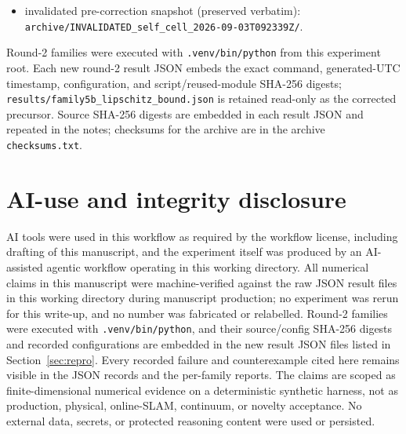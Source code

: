 \documentclass[12pt]{article}
\begin{document}
\begin{itemize}
\texttt{figures/family5\_robust\_surrogate.png}, \texttt{figures/family5\_rank\_events.png},
\texttt{figures/family4c\_trajectory\_control.png},
\texttt{figures/family6\_snr\_sweep.png}, \texttt{figures/family6\_correlation\_effect.png},
\texttt{figures/family6\_noise\_whitening\_sanity.png},
\texttt{figures/family6\_retention\_spectra\_colored.png},
\texttt{figures/family7\_resolution\_convergence.png},
\texttt{figures/family7\_frequency\_rank\_sweep.png}, \texttt{figures/family7\_contrast\_sweep.png},
\texttt{figures/family8\_composition\_identity.png}, \texttt{figures/family8\_mode\_distinction.png},
\texttt{figures/family9\_seed\_replications.png}, \texttt{figures/family9\_pose\_dof\_ablation.png},
\texttt{figures/family9\_rx\_T\_basis\_ablation.png},
\texttt{figures/family5b\_lipschitz\_bound.png}, \texttt{figures/family5b2\_alpha\_tight.png}.
\item invalidated pre-correction snapshot (preserved verbatim):
\texttt{archive/INVALIDATED\_self\_cell\_2026-09-03T092339Z/}.
\end{itemize}
Round-2 families were executed with \texttt{.venv/bin/python} from this
experiment root. Each new round-2 result JSON embeds the exact command,
generated-UTC timestamp, configuration, and script/reused-module SHA-256
digests; \texttt{results/family5b\_lipschitz\_bound.json} is retained read-only
as the corrected precursor.
Source SHA-256 digests are embedded in each result JSON and repeated in the
notes; checksums for the archive are in the archive \texttt{checksums.txt}.

\section{AI-use and integrity disclosure}\label{sec:ai}

AI tools were used in this workflow as required by the workflow license,
including drafting of this manuscript, and the experiment itself was produced
by an AI-assisted agentic workflow operating in this working directory. All
numerical claims in this manuscript were machine-verified against the raw JSON
result files in this working directory during manuscript production; no
experiment was rerun for this write-up, and no number was fabricated or
relabelled. Round-2 families were executed with \texttt{.venv/bin/python},
and their source/config SHA-256 digests and recorded configurations are
embedded in the new result JSON files listed in
Section~\ref{sec:repro}. Every recorded failure and counterexample cited here remains
visible in the JSON records and the per-family reports. The claims are scoped
as finite-dimensional numerical evidence on a deterministic synthetic harness,
not as production, physical, online-SLAM, continuum, or novelty acceptance.
No external data, secrets, or protected reasoning content were used or
persisted.
\end{document}
